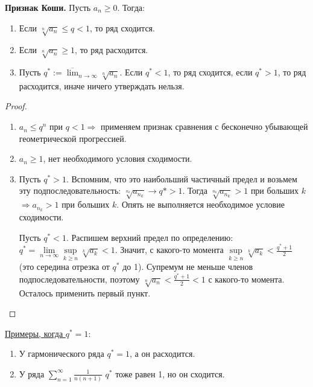 \textbf{Признак Коши.} 
Пусть $a_n \geqslant 0$. Тогда:
\begin{enumerate}
    \item Если $\sqrt[n]{a_n} \leqslant q < 1$, то ряд сходится.
    \item Если $\sqrt[n]{a_n} \geqslant 1$, то ряд расходится.
    \item Пусть $q^* := \overline{\lim}_{n \to \infty} \sqrt[n]{a_n}$.
    Если $q^* < 1$, то ряд сходится, если $q^* > 1$, то ряд расходится, иначе ничего утверждать нельзя.
\end{enumerate}
\begin{proof} \quad

    \begin{enumerate}
        \item $a_n \leqslant q^n$ при $q < 1 \Rightarrow$ применяем признак сравнения с бесконечно убывающей геометрической прогрессией.
        \item $a_n \geqslant 1$, нет необходимого условия сходимости.
        \item Пусть $q^* > 1$. 
        Вспомним, что это наибольший частичный предел и возьмем эту подпоследовательность: $\sqrt[n_k]{a_{n_k}} \to q* > 1$.
        Тогда $\sqrt[n_k]{a_{n_k}} > 1$ при больших $k$ $\Rightarrow a_{n_k} > 1$ при больших $k$.
        Опять не выполняется необходимое условие сходимости.

        Пусть $q^* < 1$. 
        Распишем верхний предел по определению: $q^* = \lim\limits_{n \to \infty} \sup\limits_{k \geqslant n} \sqrt[k]{a_k} < 1$. 
        Значит, с какого-то момента $\sup\limits_{k \geqslant n} \sqrt[k]{a_k} < \frac{q^* + 1}{2}$ (это середина отрезка от $q^*$ до 1).
        Супремум не меньше членов подпоследовательности, поэтому $\sqrt[n]{a_n} < \frac{q^* + 1}{2} < 1$ с какого-то момента.
        Осталось применить первый пункт.
    \end{enumerate}
\end{proof}

\underline{Примеры, когда $q^* = 1:$}
\begin{enumerate}
    \item У гармонического ряда $q^* = 1$, а он расходится.
    \item У ряда $\sum\limits_{n=1}^{\infty} \frac{1}{n(n+1)}$ $q^*$ тоже равен 1, но он сходится. 
\end{enumerate}

\vspace{15mm}

